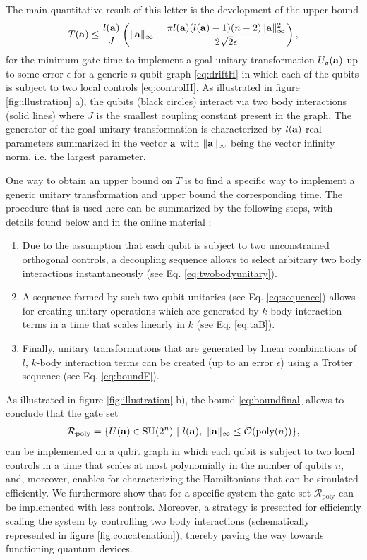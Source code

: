 \documentclass[aps,twocolumn,amsmath,amssymb,nofootinbib,superscriptaddress]{revtex4-1}
\begin{document}
The main quantitative result of this letter is the development of the upper bound 
\begin{align}
\label{eq:boundfinal}
T(\bold{a})\leq\frac{l(\bold{a})}{J}\left(\Vert \bold{a}\Vert_{\infty}+\frac{\pi l(\bold{a})(l(\bold{a})-1)(n-2)\Vert \bold{a}\Vert_{\infty}^{2}}{2\sqrt{2}\epsilon}   \right),	
\end{align}	
for the minimum gate time to implement a goal unitary transformation $U_{g}(\bold{a})$ up to some error $\epsilon$ for a generic $n$-qubit graph \eqref{eq:driftH} in which each of the qubits is subject to two local controls \eqref{eq:controlH}. As illustrated in figure \ref{fig:illustration} a), the qubits (black circles) interact via two body interactions (solid lines) where $J$ is the smallest coupling constant present in the graph. The generator of the goal unitary transformation is characterized by $l(\bold{a})$ real parameters summarized in the vector $\bold{a}$ with $\Vert\bold{a}\Vert_{\infty}$ being the vector infinity norm, i.e. the largest parameter. 
  
  One way to obtain an upper bound on $T$ is to find a specific way to implement a generic unitary transformation and upper bound the corresponding time. The procedure that is used here can be summarized by the following steps, with details found below and in the online material \cite{OnlineMaterial}:
\begin{enumerate}
\item Due to the assumption that each qubit is subject to two unconstrained orthogonal controls, a decoupling sequence allows to select arbitrary two body interactions instantaneously (see Eq. \eqref{eq:twobodyunitary}).
\item A sequence formed by such two qubit unitaries (see Eq. \eqref{eq:sequence}) allows for creating unitary operations which are generated by $k$-body interaction terms in a time that scales linearly in $k$ (see Eq. \eqref{eq:taB}). 
\item Finally, unitary transformations that are generated by linear combinations of $l$, $k$-body interaction terms can be created (up to an error $\epsilon$)  using a Trotter sequence (see Eq. \eqref{eq:boundF}). 
\end{enumerate}
As illustrated in figure \ref{fig:illustration} b), the bound \eqref{eq:boundfinal} allows to conclude that the gate set 
\begin{align}
\label{eq:setpolynomial}
\mathcal R_{\text{poly}}=\{U(\bold{a})\in \text{SU}(2^{n})~|~l(\bold{a}),~\Vert\bold{a}\Vert_{\infty} \leq \mathcal O(\text{poly}(n))\},
\end{align} 
can be implemented on a qubit graph in which each qubit is subject to two local controls in a time that scales at most polynomially in the number of qubits $n$, and, moreover, enables for characterizing the Hamiltonians that can be simulated efficiently. We furthermore show that for a specific system the gate set $\mathcal R_{\text{poly}}$ can be implemented with less controls. Moreover, a strategy is presented for efficiently scaling the system by controlling two body interactions (schematically represented in figure \ref{fig:concatenation}), thereby paving the way towards functioning quantum devices.     
\end{document}

